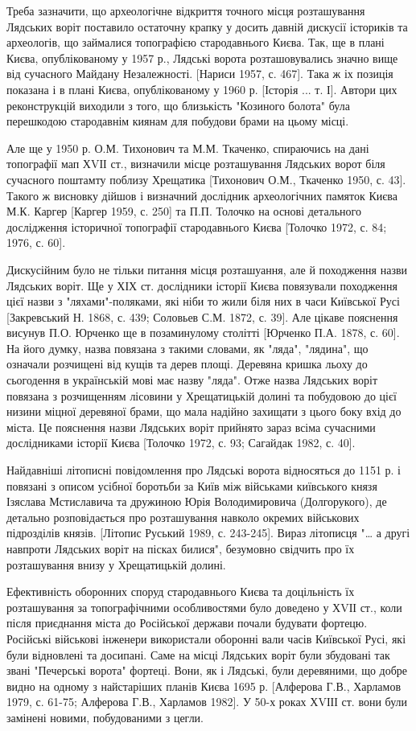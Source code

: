 Треба зазначити, що археологічне відкриття точного місця розташування Лядських
воріт поставило остаточну крапку у досить давній дискусії істориків та
археологів, що займалися топографією стародавнього Києва. Так, ще в плані
Києва, опублікованому у 1957 р., Лядські ворота розташовувались значно вище від
сучасного Майдану Незалежності. [Нариси 1957, с. 467]. Така ж іх позиція
показана і в плані Києва, опублікованому у 1960 р. [Історія ... т. І]. Автори
цих реконструкцій виходили з того, що близькість "Козиного болота" була
перешкодою стародавнім киянам для побудови брами на цьому місці.

Але ще у 1950 р. О.М. Тихонович та М.М. Ткаченко, спираючись на дані топографії
мап ХVІІ ст., визначили місце розташування Лядських ворот біля сучасного
поштамту поблизу Хрещатика [Тихонович О.М., Ткаченко 1950, с. 43]. Такого ж
висновку дійшов і визначний дослідник археологічних памяток Києва М.К. Каргер
[Каргер 1959, с. 250] та П.П. Толочко на основі детального дослідження
історичної топографії стародавнього Києва [Толочко 1972, с. 84; 1976, с. 60].

Дискусійним було не тільки питання місця розташуання, але й походження назви
Лядських воріт. Ще у ХІХ ст. дослідники історії Києва повязували походження
цієї назви з "ляхами"-поляками, які ніби то жили біля них в часи Київської Русі
[Закревський Н. 1868, с. 439; Соловьев С.М. 1872, с. 39]. Але цікаве пояснення
висунув П.О. Юрченко ще в позаминулому столітті [Юрченко П.А. 1878, с. 60]. На
його думку, назва повязана з такими словами, як "ляда", "лядина", що означали
розчищені від кущів та дерев площі. Деревяна кришка льоху до сьогодення в
українській мові має назву "ляда". Отже назва Лядських воріт повязана з
розчищенням лісовини у Хрещатицькій долині та побудовою до цієї низини міцної
деревяної брами, що мала надійно захищати з цього боку вхід до міста. Це
пояснення назви Лядських воріт прийнято зараз всіма сучасними дослідниками
історії Києва [Толочко 1972, с. 93; Сагайдак 1982, с. 40].

Найдавніші літописні повідомлення про Лядські ворота відносяться до 1151 р. і
повязані з описом усібної боротьби за Київ між військами київського князя
Ізяслава Мстиславича та дружиною Юрія Володимировича (Долгорукого), де детально
розповідається про розташування навколо окремих військових підрозділів князів.
[Літопис Руський 1989, с. 243-245]. Вираз літописця "… а другі навпроти
Лядських воріт на пісках билися", безумовно свідчить про їх розташування внизу
у Хрещатицькій долині.

Ефективність оборонних споруд стародавнього Києва та доцільність їх
розташування за топографічними особливостями було доведено у ХVІІ ст., коли
після приєднання міста до Російської держави почали будувати фортецю. Російські
військові інженери використали оборонні вали часів Київської Русі, які були
відновлені та досипані. Саме на місці Лядських воріт були збудовані так звані
"Печерські ворота" фортеці. Вони, як і Лядські, були деревяними, що добре видно
на одному з найстаріших планів Києва 1695 р. [Алферова Г.В., Харламов 1979, с.
61-75; Алферова Г.В., Харламов 1982]. У 50-х роках ХVІІІ ст. вони були замінені
новими, побудованими з цегли.

